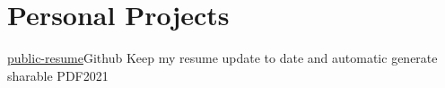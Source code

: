 \section{Personal Projects}
  \resumeSubHeadingListStart
    \resumeSubheading
      {\href{https://github.com/xtutran/public-resume}{public-resume}}{Github}
      {Keep my resume update to date and automatic generate sharable PDF}{2021}
  \resumeSubHeadingListEnd